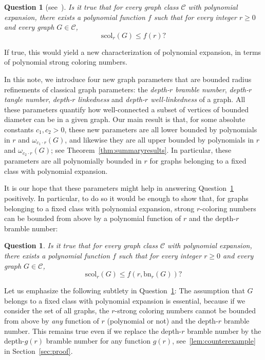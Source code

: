 \documentclass[final]{dmtcs-episciences}
\newtheorem{qn}[thm]{Question}
\theoremstyle{definition}
\theoremstyle{remark}
\newcommand{\dep}{depth}
\newcommand{\scol}{\ensuremath{\mathrm{scol}}}
\newcommand{\bn}{\ensuremath{\mathrm{bn}}}
\renewcommand{\leq}{\leqslant}
\renewcommand{\geq}{\geqslant}
\begin{document}
\begin{qn}[see~\cite{ER2018}]\label{conj:weaker} 
Is it true that for every graph class $\mathcal{C}$ with polynomial expansion, there exists a polynomial function $f$ such that for every integer $r\geq 0$ and every graph $G \in \mathcal{C}$,
\[
\scol_r(G) \leq f(r)?
\]
\end{qn}

If true, this would yield a new characterization of polynomial expansion, in terms of polynomial strong coloring numbers. 


In this note, we introduce  four new graph parameters that are bounded radius refinements of classical graph parameters: the \emph{\dep-$r$ bramble number}, \emph{\dep-$r$ tangle number}, \emph{\dep-$r$ linkedness} and \emph{\dep-$r$ well-linkedness} of a graph. All these parameters quantify how well-connected a subset of vertices of bounded diameter can be in a given graph. 
Our main result is that, for some absolute constants $c_1, c_2 >0$, these new parameters are all lower bounded by polynomials in $r$ and $\omega_{c_1\cdot r}(G)$, and likewise they are all upper bounded by polynomials in $r$ and $\omega_{c_2\cdot r}(G)$; see Theorem~\ref{thm:summaryresults}. 
In particular, these parameters are all polynomially bounded in $r$ for graphs belonging to a fixed class with polynomial expansion.  


It is our hope that these parameters might help in answering  Question~\ref{conj:weaker} positively. 
In particular, to do so it would be enough to show that, for graphs belonging to a fixed class with polynomial expansion, strong $r$-coloring numbers can be bounded from above by a polynomial function of $r$ and the \dep-$r$ bramble number: 


\begin{qn}\label{quest:equiv}
Is it true that for every graph class $\mathcal{C}$ with polynomial expansion, there exists a polynomial function $f$ such that for every integer $r\geq 0$ and every graph $G \in \mathcal{C}$, 
\[
\scol_r(G) \leq f(r,\bn_{r}(G))?
\]
\end{qn}

Let us emphasize the following subtlety in Question~\ref{quest:equiv}: The assumption that $G$ belongs to a fixed class with polynomial expansion is essential, because if we consider the set of all graphs, the $r$-strong coloring numbers cannot be bounded from above by {\em any} function of $r$ (polynomial or not) and the \dep-$r$ bramble number. 
This remains true even if we replace the \dep-$r$ bramble number by the \dep-$g(r)$ bramble number for any function $g(r)$, see~\cref{lem:counterexample} in Section~\ref{sec:proof}. 
\end{document}
